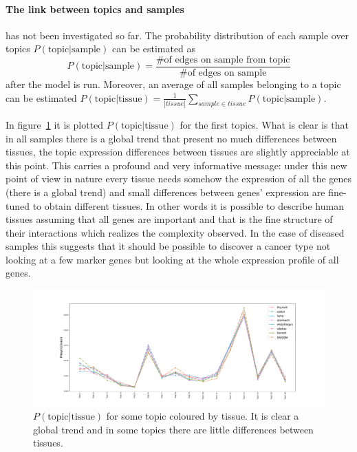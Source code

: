 \FloatBarrier
\paragraph{The link between topics and samples} has not been investigated so far. The probability distribution of each sample over topics $P(\text{topic}| \text{sample})$ can be estimated as \[P(\text{topic}| \text{sample})=\frac{\text{\# of edges on sample from topic}}{\text{\# of edges on sample}}\] after the model is run. Moreover, an average of all samples belonging to a topic can be estimated $P(\text{topic}| \text{tissue})=\frac{1}{\left|tissue\right|}\sum_{sample\in tissue}P(\text{topic}| \text{sample})$.

In figure~\ref{fig:topic/merged/lifeplot} it is plotted $P(\text{topic}| \text{tissue})$ for the first topics. What is clear is that in all samples there is a global trend that present no much differences between tissues, the topic expression differences between tissues are slightly appreciable at this point. This carries a profound and very informative message: under this new point of view in nature every tissue needs somehow the expression of all the genes (there is a global trend) and small differences between genes' expression are fine-tuned to obtain different tissues. In other words it is possible to describe human tissues assuming that all genes are important and that is the fine structure of their interactions which realizes the complexity observed. In the case of diseased samples this suggests that it should be possible to discover a cancer type not looking at a few marker genes but looking at the whole expression profile of all genes.
\begin{figure}[htb!]
	\centering
	\includegraphics[width=0.9\linewidth]{pictures/topic/merged/lifeplot.pdf}
	\caption{$P(\text{topic} | \text{tissue})$ for some topic coloured by tissue. It is clear a global trend and in some topics there are little differences between tissues.}
	\label{fig:topic/merged/lifeplot}
\end{figure}

